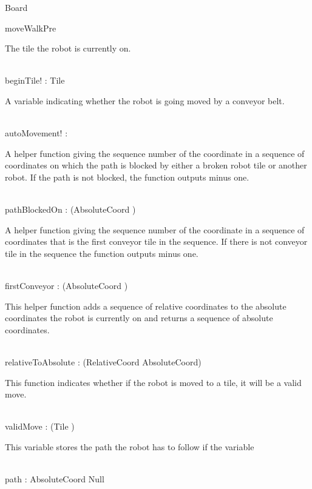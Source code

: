\documentclass[12pt]{article}
\begin{document}
\begin{class}{Board}
\begin{nobottomschema}{moveWalkPre}
\begin{zpar}
The tile the robot is currently on.
\end{zpar} \\
beginTile! : Tile \\
\begin{zpar}
A variable indicating whether the robot is going moved by a conveyor belt.
\end{zpar} \\
autoMovement! : \bool \\
\end{nobottomschema}
\znewpage
\begin{nobothschema}
\begin{zpar}
A helper function giving the sequence number of the coordinate in a sequence of coordinates on which the path is blocked by either a broken robot tile or another robot. If the path is not blocked, the function outputs minus one.
\end{zpar} \\
pathBlockedOn : \power (\seq AbsoluteCoord \fun \nat) \\
\begin{zpar}
A helper function giving the sequence number of the coordinate in a sequence of coordinates that is the first conveyor tile in the sequence. If there is not conveyor tile in the sequence the function outputs minus one.
\end{zpar} \\
firstConveyor : \power (\seq AbsoluteCoord \fun \nat) \\
\begin{zpar}
This helper function adds a sequence of relative coordinates to the absolute coordinates the robot is currently on and returns a sequence of absolute coordinates.
\end{zpar} \\
relativeToAbsolute : \power (\seq RelativeCoord \pfun \seq AbsoluteCoord) \\
\begin{zpar}
This function indicates whether if the robot is moved to a tile, it will be a valid move.
\end{zpar} \\
validMove : \power (Tile \fun \bool) \\
\begin{zpar}
This variable stores the path the robot has to follow if the variable
\end{zpar} \\
path : \power \seq AbsoluteCoord \cup Null \\
\where

\end{nobothschema}
\end{class}
\end{document}
